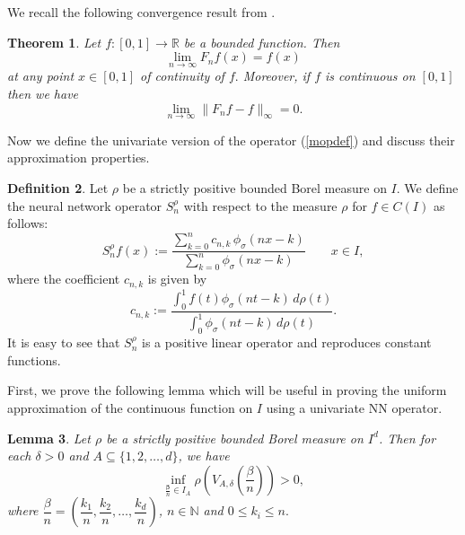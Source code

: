 \documentclass[12pt, reqno]{amsart}
\numberwithin{equation}{section}
\newtheorem{theorem}{Theorem}[section]
\newtheorem{lemma}[theorem]{Lemma}
\theoremstyle{definition}
\newtheorem{definition}[theorem]{Definition}
\theoremstyle{remark}
\numberwithin{equation}{section}
\newcommand{\R}{\mathbb{R}}
\newcommand{\N}{\mathbb{N}}
\begin{document}
We recall the following convergence result from \cite{Costar1}. 
\begin{theorem} \label{opuni}
    Let $f:[0,1]\to\R$ be a bounded function. Then
    $$\lim_{n\to\infty}F_nf(x)=f(x)$$ at any point $x\in[0,1]$ of continuity of $f.$ Moreover, if $f$ is continuous on $[0,1]$ then we have
    $$\lim_{n\to\infty}\|F_nf-f\|_{\infty}=0.$$
\end{theorem}
Now we define the univariate version of the operator (\ref{mopdef}) and discuss their approximation properties.
\begin{definition}
Let $\rho$ be a strictly positive bounded Borel measure on $I$. We define the neural network operator $S^{\rho}_{n}$ with respect to the measure $\rho$ for $f\in C(I)$ as follows:
\[S^{\rho}_{n}f(x):=\dfrac{\displaystyle{\sum_{k=0}^{n}}{c_{n,k}\,\phi_\sigma(nx-k)}}{\displaystyle{\sum_{k=0}^{n}}\phi_\sigma(nx-k)}\quad\quad x\in I,\label{opdefuni}\] where the coefficient $c_{n,k}$ is given by 
$$c_{n,k}:=\dfrac{\int_{0}^{1}f(t)\phi_\sigma(nt-k)\,d\rho(t)} {\int_{0}^{1}\phi_\sigma(nt-k)\,d\rho(t)}.$$ 
 It is easy to see that $S^{\rho}_{n}$ is a positive linear operator and reproduces constant functions.
\end{definition}
    
First, we prove the following lemma which will be useful in proving the uniform approximation of the continuous function on $I$ using a univariate NN operator. 

\begin{lemma} \label{mmpos}
 Let $\rho$ be a strictly positive bounded Borel measure on $I^d$. Then for each  $\delta>0$ and  $A\subseteq \{1,2,\ldots,d\}$, we have 
  $$\inf_{\frac{\mathbf{\beta}}{n}\in I_A}\rho\left(V_{A,\delta}\left(\frac{\beta}{n}\right)\right) >0,$$ where $\dfrac{\beta}{n}=\left(\dfrac{k_1}{n},\dfrac{k_2}{n},\ldots,\dfrac{k_d}{n}\right)$, $n\in\N$ and $0\leq k_i\leq n.$ 
  \end{lemma}
  
\end{document}

